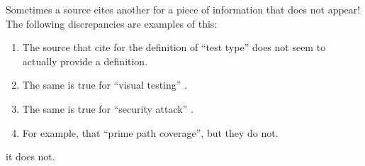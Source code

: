 Sometimes a source cites another for a piece of information that does not
appear! \ifnotpaper The following discrepancies are examples of this:

    \begin{enumerate}
        \item %
              The source that \citetISTQB{} cite for the definition of ``test
              type'' does not seem to actually provide a definition.
        \item %
              The same is true for ``visual testing'' \citepISTQB{}.
        \item %
              The same is true for ``security attack'' \citepISTQB{}.
        \item %
              \else For example, \fi \citet[p.~184]{DoğanEtAl2014}
               that \citet{SakamotoEtAl2013}
               ``prime path coverage'', but \ifnotpaper
              they do not. \end{enumerate} \else it does not. \fi
